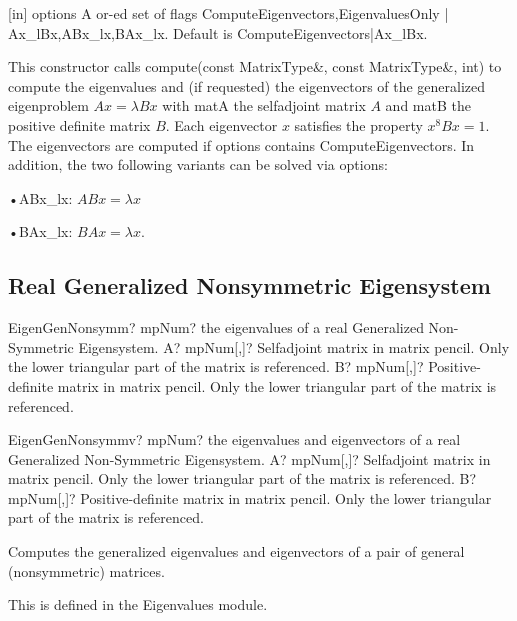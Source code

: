 [in] options A or-ed set of flags {ComputeEigenvectors,EigenvaluesOnly} | {Ax\_lBx,ABx\_lx,BAx\_lx}. Default is ComputeEigenvectors|Ax\_lBx. 

This constructor calls compute(const MatrixType\&, const MatrixType\&, int) to compute the eigenvalues and (if requested) the eigenvectors of the generalized eigenproblem $Ax = \lambda B x$ with matA the selfadjoint matrix $A$ and matB the positive definite matrix $B$. Each eigenvector $x$ satisfies the property $x^8 B x =1$. The eigenvectors are computed if options contains ComputeEigenvectors.
In addition, the two following variants can be solved via options: 

•ABx\_lx: $A B x = \lambda x$

•BAx\_lx: $B A x = \lambda x$.




\newpage
\subsection{Real Generalized Nonsymmetric Eigensystem}



\begin{mpFunctionsExtract}
	\mpFunctionTwo
	{EigenGenNonsymm? mpNum? the eigenvalues of a real Generalized Non-Symmetric Eigensystem.}
	{A? mpNum[,]? Selfadjoint matrix in matrix pencil. Only the lower triangular part of the matrix is referenced.}
	{B? mpNum[,]? Positive-definite matrix in matrix pencil. Only the lower triangular part of the matrix is referenced.}
\end{mpFunctionsExtract}

\vspace{0.6cm}
\begin{mpFunctionsExtract}
	\mpFunctionTwo
	{EigenGenNonsymmv? mpNum? the eigenvalues and eigenvectors of a real Generalized Non-Symmetric Eigensystem.}
	{A? mpNum[,]? Selfadjoint matrix in matrix pencil. Only the lower triangular part of the matrix is referenced.}
	{B? mpNum[,]? Positive-definite matrix in matrix pencil. Only the lower triangular part of the matrix is referenced.}
\end{mpFunctionsExtract}



Computes the generalized eigenvalues and eigenvectors of a pair of general (nonsymmetric) matrices. 

This is defined in the Eigenvalues module.

